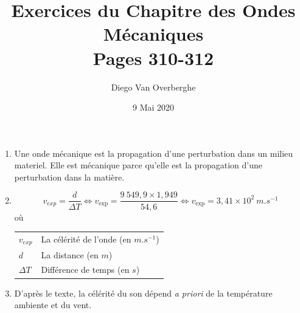 \documentclass[12pt, a4paper]{article}
\makeatletter
\newenvironment{conditions}
  {\par\vspace{\abovedisplayskip}\noindent\begin{tabular}{>{$}l<{$} @{${\quad}={\quad}$} l}}
  {\end{tabular}\par\vspace{\belowdisplayskip}}
\makeatother
\begin{document}
    
    \title{Exercices du Chapitre des Ondes Mécaniques \\ \Large{Pages 310-312}}
    \author{Diego Van Overberghe}
    \date{9 Mai 2020}
    \maketitle

    \begin{Exercise}[number={24}]
        \begin{enumerate}[1.]
            \item Une onde mécanique est la propagation d'une perturbation dans un milieu materiel. Elle est mécanique parce qu'elle est la propagation d'une perturbation dans la matière.
        \item   \begin{equation*}
                    v_{exp}=\frac{d}{\Delta T}
                    \iff v_\text{exp}=\frac{9\ 549{,}9\times 1{,}949}{54{,}6}
                    \iff v_\text{exp}=3{,}41\times 10^2\ \si{m.s^{-1}}
                \end{equation*} où
                \begin{conditions}
                    v_{exp}  & La célérité de l'onde (en $\si{m.s^{-1}}$) \\
                    d        & La distance (en $\si{m}$) \\
                    \Delta T & Différence de temps (en $\si{s}$)
                \end{conditions}

        \item D'après le texte, la célérité du son dépend \textit{a priori} de la température ambiente et du vent.
        \end{enumerate}
    \end{Exercise}
\end{document}
